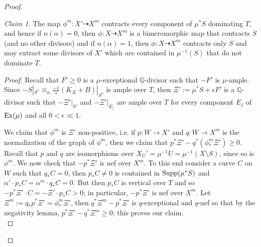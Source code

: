 \documentclass[12pt]{amsart}
\theoremstyle{plain}
\theoremstyle{remark}
\theoremstyle{definition}
\newcommand{\<}{\leq}
\newcommand{\Q}{{\mathbb{Q}}}
\newcommand{\Supp}{{\rm Supp}}
\theoremstyle{definition}
\theoremstyle{definition}
\numberwithin{equation}{section}
\theoremstyle{remark}
\newtheorem{claim}[theorem]{Claim}
\begin{document}
\begin{proof}
\begin{claim}
    The map $\phi^m:X'\dasharrow X^m$ contracts every component of $\mu ^*S$ dominating $T$, and hence if $n(\alpha )=0$, then $\phi :X\dasharrow X^m$ is a bimeromorphic map that contracts $S$ (and no other divisors) and if $n(\alpha )=1$, then $\phi :X\dasharrow X^m$ contracts only $S$ and may extract some divisors of $X'$ which are contained in $\mu ^{-1}(S)$ that do not dominate $T$.
\end{claim}
\begin{proof}
    Recall that $F'\geq 0$ is a $\mu$-exceptional $\Q$-divisor such that $-F'$ is $\mu$-ample. Since $-S|_{S^\nu}\equiv_\alpha  \frac {-1}s(K_X+B)|_{S^\nu}$ %
    is ample over $T$, then $\Xi':=\mu ^*S+\epsilon F'$ is a $\Q$-divisor such that $-\Xi'|_{S'}$ and $-\Xi'|_{E_j}$ are ample over $T$ for every component $E_j$ of ${\rm Ex}(\mu)$ and all $0<\epsilon \ll 1$. 
    
    We claim that $\phi^m$ is $\Xi'$ non-positive, i.e. if $p:W\to X'$ and $q:W\to X^m$ is the normalization of the graph of $\phi^m$, then we claim that $p^*\Xi'-q^*(\phi ^m_*\Xi')\geq 0$. Recall that $p$ and $q$ are isomorphisms over $X_{U}'=\mu^{-1}U=\mu^{-1}(X\setminus S)$, since so is $\phi^m$. We now check that $-p^* \Xi'$ is nef over $X^m$. To this end consider a curve $C$ on $W$ such that $q_*C=0$, then $p_*C\ne 0$ is contained in $\Supp(\mu^*S)$ and $\alpha '\cdot p_*C=\alpha ^m\cdot q_*C=0$.
    But then $p_*C$ is vertical over $T$ and so $-p^* \Xi'\cdot C=-\Xi'\cdot p_*C>0$; in particular, $-p^*\Xi'$ is nef over $X^m$.
    Let $\Xi^m:=q_* p^*\Xi'=\phi^m_*\Xi'$, then $q^*\Xi^m-p^*\Xi'$ is $q$-exceptional and $q$-nef so that by the negativity lemma, $p^*\Xi'-q^*\Xi^m\geq 0$; this proves our claim.\\
    

\end{proof}
\end{proof}
\end{document}
